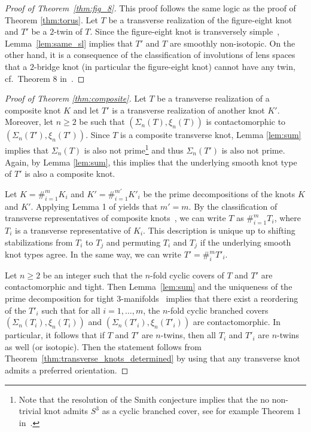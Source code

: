 \documentclass[11pt]{amsart}
\theoremstyle{definition}
\theoremstyle{definition}
\theoremstyle{definition}
\theoremstyle{definition}
\begin{document}
 \begin{proof}[Proof of Theorem~\ref{thm:fig_8}]
 This proof follows the same logic as the proof of Theorem \ref{thm:torus}. 
    Let $T$ be a transverse realization of the figure-eight knot and $T'$ be a $2$-twin of $T$. Since the figure-eight knot is transversely simple~\cite{Etnyre_Honda}, Lemma~\ref{lem:same_sl} implies that $T'$ and $T$ are smoothly non-isotopic. On the other hand, it is a consequence of the classification of involutions of lens spaces \cite{Hodgson_Rubinstein} that a $2$-bridge knot (in particular the figure-eight knot) cannot have any twin, cf.\ Theorem 8 in~\cite{Paoluzzi_survey}.
 \end{proof}

\begin{proof}[Proof of Theorem \ref{thm:composite}]
    Let $T$ be a transverse realization of a composite knot $K$ and let $T'$ is a transverse realization of another knot $K'$. Moreover, let $n\geq2$ be such that $(\Sigma_n(T),\xi_n(T))$ is contactomorphic to $(\Sigma_n(T'),\xi_n(T'))$. Since $T$ is a composite transverse knot, Lemma \ref{lem:sum} implies that $\Sigma_n(T)$ is also not prime\footnote{Note that the resolution of the Smith conjecture implies that the no non-trivial knot admits $S^3$ as a cyclic branched cover, see for example Theorem 1 in~\cite{Paoluzzi_survey}.} and thus $\Sigma_n(T')$ is also not prime. Again, by Lemma \ref{lem:sum}, this implies that the underlying smooth knot type of $T'$ is also a composite knot. 

    Let $K=\#_{i=1}^m K_i$ and $K'=\#_{i=1}^{m'} K'_i$ be the prime decompositions of the knots $K$ and $K'$. Applying Lemma 1 of \cite{Paoluzzi_survey} yields that $m'=m$. By the classification of transverse representatives of composite knots~\cite{Etnyre_Honda_sum}, we can write $T$ as $\#_{i=1}^m T_i$, where $T_i$ is a transverse representative of $K_i$. This description is unique up to shifting stabilizations from $T_i$ to $T_j$ and permuting $T_i$ and $T_j$ if the underlying smooth knot types agree. In the same way, we can write $T'=\#_i^m T'_i$.

    Let $n\geq2$ be an integer such that the $n$-fold cyclic covers of $T$ and $T'$ are contactomorphic and tight. Then Lemma~\ref{lem:sum} and the uniqueness of the prime decomposition for tight $3$-manifolds~\cite{Geiges} implies that there exist a reordering of the $T'_i$ such that for all $i=1,\ldots,m$, the $n$-fold cyclic branched covers $(\Sigma_n(T_i),\xi_n(T_i))$ and $(\Sigma_n(T'_i),\xi_n(T'_i))$ are contactomorphic. In particular, it follows that if $T$ and $T'$ are $n$-twins, then all $T_i$ and $T'_i$ are $n$-twins as well (or isotopic). Then the statement follows from Theorem~\ref{thm:transverse_knots_determined} by using that any transverse knot admits a preferred orientation.
\end{proof}
\end{document}
